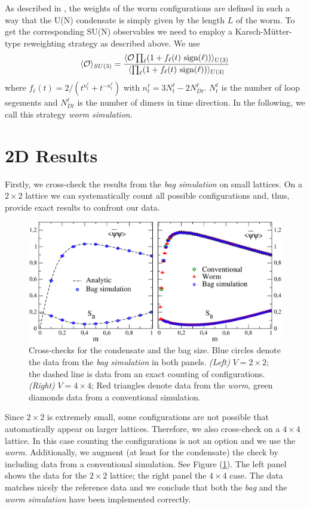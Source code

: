 \documentclass{PoS}
\begin{document}
As described in \cite{Adams:2003cca}, the weights of the worm configurations are defined in such a way that the U(N) condensate is simply given by the length $L$ of the worm. To get the corresponding SU(N) observables we need to employ a Karsch-M\"utter-type reweighting strategy as described above. We use \cite{Boyd:1991fb}
\begin{equation}
\langle \mathcal{O} \rangle_{\tiny SU(3)} = \frac{\langle \mathcal{O} \prod_{\ell}(1 + f_{\ell}(t)\text{ sign}(\ell)) \rangle_{\tiny U(3)}}{\langle \prod_{\ell}(1 + f_{\ell}(t)\text{ sign}(\ell)) \rangle_{\tiny U(3)}}
\end{equation}
where $f_{\ell}(t) = 2/(t^{n^{\ell}_t} + t^{-n^{\ell}_t})$ with $n^{\ell}_t = 3N^{\ell}_t - 2N^{\ell}_{Dt}$. $N^{\ell}_t$ is the number of loop segements and $N^{\ell}_{Dt}$ is the number of dimers in time direction. In the following, we call this strategy \textit{worm simulation}.

\section{2D Results}

Firstly, we cross-check the results from the \textit{bag simulation} on small lattices. On a $2\times 2$ lattice we can systematically count all possible configurations and, thus, provide exact results to confront our data. 
\begin{figure}
\centering
\includegraphics[width=0.7\linewidth]{Plots/Checks/Comb/V2n4_SB_cond_m0to1_combined.pdf}
\caption{Cross-checks for the condensate and the bag size. Blue circles denote the data from the \textit{bag simulation} in both panels. \textit{(Left)} $V = 2\times 2$; the dashed line is data from an exact counting of configurations. \textit{(Right)} $V = 4\times 4$; Red triangles denote data from the \textit{worm}, green diamonds data from a conventional simulation.}
\label{fig:check}
\end{figure}
Since $2\times 2$ is extremely small, some configurations are not possible that automatically appear on larger lattices.  Therefore, we also cross-check on a $4\times 4$ lattice. In this case counting the configurations is not an option and we use the \textit{worm}. Additionally, we augment (at least for the condensate) the check by including data from a conventional simulation. See Figure (\ref{fig:check}). The left panel shows the data for the $2\times 2$ lattice; the right panel the $4\times 4$ case. The data matches nicely the reference data and we conclude that both the \textit{bag} and the \textit{worm simulation} have been implemented correctly.
\end{document}
